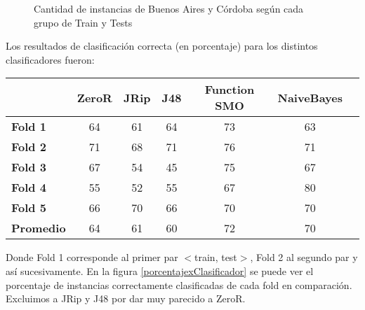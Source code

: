 \begin{figure}[H]
\centering
\pgfplotsset{width=10cm, height=4cm}
\caption{Cantidad de instancias de Buenos Aires y Córdoba según cada grupo de Train y Tests}
\label{TestsInstances}
\end{figure}

Los resultados de clasificación correcta (en porcentaje) para los distintos clasificadores fueron:

\begin{table}[H]
\centering
\begin{tabular}{|l|c|c|c|c|c|c|}
\hline
\textbf{}  & \textbf{ZeroR} & \textbf{JRip} & \textbf{J48} & \textbf{Function SMO} & \textbf{NaiveBayes} \\ \hline
\textbf{Fold 1}  & 64 & 61 & 64 & 73 & 63 \\ \hline
\textbf{Fold 2}  & 71 & 68 & 71 & 76 & 71 \\ \hline
\textbf{Fold 3}  & 67 & 54 & 45 & 75 & 67 \\ \hline
\textbf{Fold 4}  & 55 & 52 & 55 & 67 & 80 \\ \hline
\textbf{Fold 5}  & 66 & 70 & 66 & 70 & 70 \\ \hline
\hline \hline
\textbf{Promedio} & 64 & 61 & 60 & 72 & 70 \\ \hline
\end{tabular}
\end{table}

Donde Fold 1 corresponde al primer par $<$train, test$>$, Fold 2 al segundo par y así sucesivamente. En la figura \ref{porcentajexClasificador} se puede ver el porcentaje de instancias correctamente clasificadas de cada fold en comparación. Excluimos a JRip y J48 por dar muy parecido a ZeroR.

